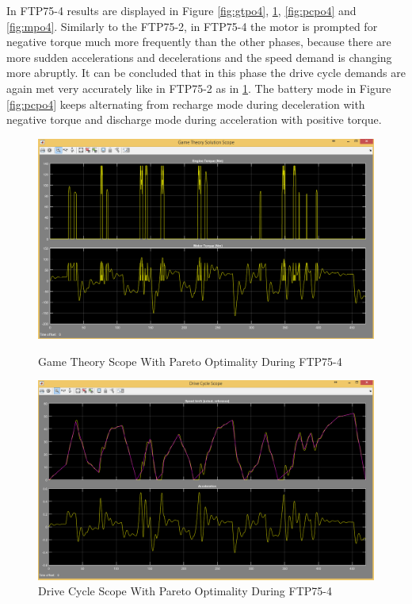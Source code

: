 In FTP75-4 results are displayed in Figure \ref{fig:gtpo4}, \ref{fig:dcpo4}, \ref{fig:pcpo4} and \ref{fig:mpo4}. Similarly to the FTP75-2, in FTP75-4 the motor is prompted for negative torque much more frequently than the other phases, because there are more sudden accelerations and decelerations and the speed demand is changing more abruptly. It can be concluded that in this phase the drive cycle demands are again met very accurately like in FTP75-2 as in \ref{fig:dcpo4}. The battery mode in Figure \ref{fig:pcpo4} keeps alternating from recharge mode during deceleration with negative torque and discharge mode during acceleration with positive torque.

\begin{figure}[hp]
\centering
\includegraphics[scale=0.475]{figures/Pareto/FTP75-4/gameTheory05Juli}
\caption{Game Theory Scope With Pareto Optimality During FTP75-4}
\label{fig:gtpo4}
\includegraphics[scale=0.45]{figures/Pareto/FTP75-4/driveCycle05Juli}
\caption{Drive Cycle Scope With Pareto Optimality During FTP75-4}
\label{fig:dcpo4}
\end{figure}

